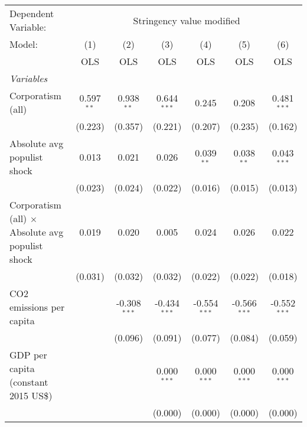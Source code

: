 
\begingroup
\centering
\begin{tabular}{lcccccc}
   \toprule
   Dependent Variable: & \multicolumn{6}{c}{Stringency value modified}\\
   Model:                                                  & (1)          & (2)            & (3)            & (4)            & (5)            & (6)\\  
                                                           &  OLS         & OLS            & OLS            & OLS            & OLS            & OLS\\  
   \midrule
   \emph{Variables}\\
   Corporatism (all)                                       & 0.597$^{**}$ & 0.938$^{**}$   & 0.644$^{***}$  & 0.245          & 0.208          & 0.481$^{***}$\\   
                                                           & (0.223)      & (0.357)        & (0.221)        & (0.207)        & (0.235)        & (0.162)\\   
   Absolute avg populist shock                             & 0.013        & 0.021          & 0.026          & 0.039$^{**}$   & 0.038$^{**}$   & 0.043$^{***}$\\   
                                                           & (0.023)      & (0.024)        & (0.022)        & (0.016)        & (0.015)        & (0.013)\\   
   Corporatism (all) $\times$ Absolute avg populist shock  & 0.019        & 0.020          & 0.005          & 0.024          & 0.026          & 0.022\\   
                                                           & (0.031)      & (0.032)        & (0.032)        & (0.022)        & (0.022)        & (0.018)\\   
   CO2 emissions per capita                                &              & -0.308$^{***}$ & -0.434$^{***}$ & -0.554$^{***}$ & -0.566$^{***}$ & -0.552$^{***}$\\   
                                                           &              & (0.096)        & (0.091)        & (0.077)        & (0.084)        & (0.059)\\   
   GDP per capita (constant 2015 US\$)                     &              &                & 0.000$^{***}$  & 0.000$^{***}$  & 0.000$^{***}$  & 0.000$^{***}$\\   
                                                           &              &                & (0.000)        & (0.000)        & (0.000)        & (0.000)\\   

\end{tabular}

